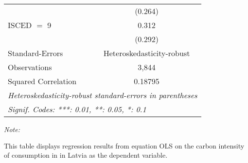 \begin{table}[htbp!]
\begin{adjustbox}{width = 1\textwidth, max height = 0.95\textheight, center}
\begin{threeparttable}[b]
\begin{tabular}{lc}
                                & (0.264)\\   
            ISCED $=$ 9         & 0.312\\   
                                & (0.292)\\   
            \midrule 
            Standard-Errors     & Heteroskedasticity-robust \\   
            Observations        & 3,844\\  
            Squared Correlation & 0.18795\\  
            \midrule \midrule
            \multicolumn{2}{l}{\emph{Heteroskedasticity-robust standard-errors in parentheses}}\\
            \multicolumn{2}{l}{\emph{Signif. Codes: ***: 0.01, **: 0.05, *: 0.1}}\\
         \end{tabular}
         
         \begin{tablenotes}\item \medskip \textit{Note:}
            \item This table displays regression results from equation OLS on the carbon intensity of consumption in  in Latvia as the dependent variable. 
         \end{tablenotes}
      \end{threeparttable}
   \end{adjustbox}
\end{table}


